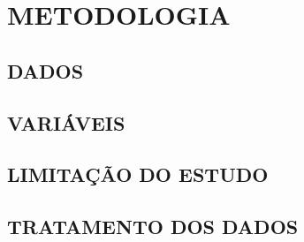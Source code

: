 \chapter{METODOLOGIA}
\label{chap:metodologia}

	\section{DADOS}
	
	
	\section{VARIÁVEIS}
	
	
	\section{LIMITAÇÃO DO ESTUDO}
	
	
	\section{TRATAMENTO DOS DADOS}